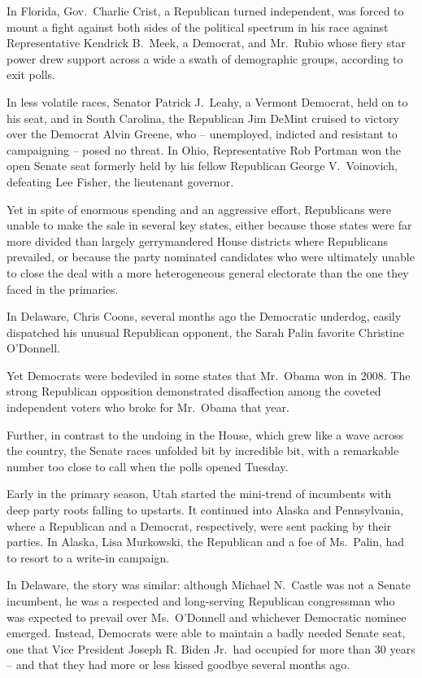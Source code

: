 ﻿\documentclass[12pt]{article}
\begin{document}
In Florida, Gov.~Charlie Crist, a Republican turned independent, was forced to mount a fight against
both sides of the political spectrum in his race against Representative Kendrick B.~Meek, a
Democrat, and Mr.~Rubio whose fiery star power drew support across a wide a swath of demographic
groups, according to exit polls.

In less volatile races, Senator Patrick J.~Leahy, a Vermont Democrat, held on to his seat, and in
South Carolina, the Republican Jim DeMint cruised to victory over the Democrat Alvin Greene, who --
unemployed, indicted and resistant to campaigning -- posed no threat. In Ohio, Representative Rob
Portman won the open Senate seat formerly held by his fellow Republican George V.~Voinovich,
defeating Lee Fisher, the lieutenant governor.

Yet in spite of enormous spending and an aggressive effort, Republicans were unable to make the sale
in several key states, either because those states were far more divided than largely gerrymandered
House districts where Republicans prevailed, or because the party nominated candidates who were
ultimately unable to close the deal with a more heterogeneous general electorate than the one they
faced in the primaries.

In Delaware, Chris Coons, several months ago the Democratic underdog, easily dispatched his unusual
Republican opponent, the Sarah Palin favorite Christine O'Donnell.

Yet Democrats were bedeviled in some states that Mr.~Obama won in 2008. The strong Republican
opposition demonstrated disaffection among the coveted independent voters who broke for Mr.~Obama
that year.

Further, in contrast to the undoing in the House, which grew like a wave across the country, the
Senate races unfolded bit by incredible bit, with a remarkable number too close to call when the
polls opened Tuesday.

Early in the primary season, Utah started the mini-trend of incumbents with deep party roots falling
to upstarts. It continued into Alaska and Pennsylvania, where a Republican and a Democrat,
respectively, were sent packing by their parties. In Alaska, Lisa Murkowski, the Republican and a
foe of Ms.~Palin, had to resort to a write-in campaign.

In Delaware, the story was similar: although Michael N.~Castle was not a Senate incumbent, he was a
respected and long-serving Republican congressman who was expected to prevail over Ms.~O'Donnell and
whichever Democratic nominee emerged. Instead, Democrats were able to maintain a badly needed Senate
seat, one that Vice President Joseph R. Biden Jr.~had occupied for more than 30 years -- and that
they had more or less kissed goodbye several months ago.
\end{document}
